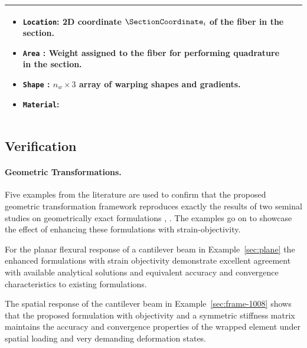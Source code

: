 \begin{table}[H]
\begin{tabular}{ll}
\begin{minipage}[t]{0.8\textwidth}
          \begin{itemize}
             \item \texttt{Location}: 2D coordinate \(\SectionCoordinate_i\) of the fiber in the section.
             \item \texttt{Area}  : Weight assigned to the fiber for performing quadrature in the section.
             \item \texttt{Shape}  : $n_w\times 3$ array of warping shapes and gradients. 
             \item \texttt{Material}: 
          \end{itemize}
        \end{minipage}
        \\
        \bottomrule
    \end{tabular}
\end{table}

\subsection{Verification}
\paragraph{Geometric Transformations.}
Five examples from the literature are used to confirm that the proposed geometric transformation framework
reproduces exactly the results of two seminal studies on geometrically exact formulations \citep{simo1986threedimensional}, \cite{ibrahimbegović1995computational}.
%
The examples go on to showcase the effect of enhancing these formulations with strain-objectivity.

For the planar flexural response of a cantilever beam in  Example~\ref{sec:plane} the enhanced formulations with strain objectivity demonstrate excellent agreement with available analytical solutions and equivalent accuracy and convergence characteristics to existing formulations.

The spatial response of the cantilever beam in Example~\ref{sec:frame-1008}
shows that the proposed formulation with objectivity and a symmetric stiffness matrix maintains the accuracy and convergence properties of the wrapped element under spatial loading and very demanding deformation states.  

